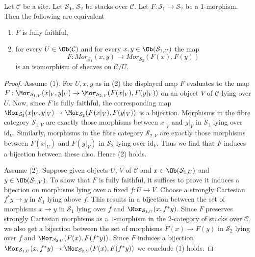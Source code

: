 \begin{lemma}
\label{lemma-characterize-ff}
Let $\mathcal{C}$ be a site.
Let $\mathcal{S}_1$, $\mathcal{S}_2$ be stacks over $\mathcal{C}$.
Let $F : \mathcal{S}_1 \to \mathcal{S}_2$ be a $1$-morphism.
Then the following are equivalent
\begin{enumerate}
\item $F$ is fully faithful,
\item for every $U \in \Ob(\mathcal{C})$ and for every
$x, y \in \Ob(\mathcal{S}_{1, U})$ the map
$$
F :
\mathit{Mor}_{\mathcal{S}_1}(x, y)
\longrightarrow
\mathit{Mor}_{\mathcal{S}_2}(F(x), F(y))
$$
is an isomorphism of sheaves on $\mathcal{C}/U$.
\end{enumerate}
\end{lemma}

\begin{proof}
Assume (1). For $U, x, y$ as in (2) the displayed map $F$ evaluates to the map
$F : \Mor_{\mathcal{S}_{1, V}}(x|_V, y|_V) \to
\Mor_{\mathcal{S}_{2, V}}(F(x|_V), F(y|_V))$
on an object $V$ of $\mathcal{C}$ lying over $U$.
Now, since $F$ is fully faithful, the corresponding map
$\Mor_{\mathcal{S}_1}(x|_V, y|_V) \to \Mor_{\mathcal{S}_2}(F(x|_V), F(y|_V))$
is a bijection. Morphisms in the fibre category $\mathcal{S}_{1, V}$ are
exactly those morphisms between $x|_V$ and $y|_V$ in $\mathcal{S}_1$ lying
over $\text{id}_V$. Similarly, morphisms in the fibre category
$\mathcal{S}_{2, V}$ are exactly those morphisms between $F(x|_V)$ and
$F(y|_V)$ in $\mathcal{S}_2$ lying over $\text{id}_V$. Thus we find that $F$
induces a bijection between these also. Hence (2) holds.

\medskip\noindent
Assume (2). Suppose given objects $U$, $V$ of $\mathcal{C}$ and
$x \in \Ob(\mathcal{S}_{1, U})$ and
$y \in \Ob(\mathcal{S}_{1, V})$. To show that $F$ is fully faithful,
it suffices to prove it induces a bijection on
morphisms lying over a fixed $f : U \to V$. Choose a strongly Cartesian
$f^*y \to y$ in $\mathcal{S}_1$ lying above $f$. This results in a
bijection between the set of morphisms $x \to y$ in $\mathcal{S}_1$ lying
over $f$ and $\Mor_{\mathcal{S}_{1, U}}(x, f^*y)$. Since $F$ preserves
strongly Cartesian morphisms as a $1$-morphism in the $2$-category
of stacks over $\mathcal{C}$, we also get a bijection
between the set of morphisms $F(x) \to F(y)$ in $\mathcal{S}_2$ lying
over $f$ and $\Mor_{\mathcal{S}_{2, U}}(F(x), F(f^*y))$.
Since $F$ induces a bijection
$\Mor_{\mathcal{S}_{1, U}}(x, f^*y) \to
\Mor_{\mathcal{S}_{2, U}}(F(x), F(f^*y))$
we conclude (1) holds.
\end{proof}


